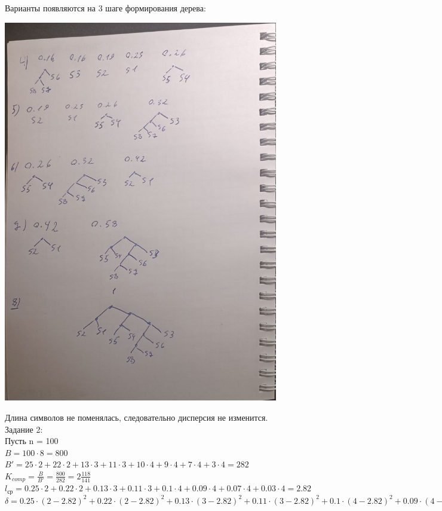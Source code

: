 \documentclass[a4paper,14pt]{extarticle}
\begin{document}
Варианты появляются на 3 шаге формирования дерева:
\begin{center}
    \includegraphics[width=120mm]{task1_var1.jpg}\\
\end{center}
Длина символов не поменялась, следовательно дисперсия не изменится.\\

Задание 2:\\
Пусть n = 100\\
$B = 100 \cdot 8 = 800$\\
$B' = 25 \cdot 2 + 22 \cdot 2 + 13 \cdot 3 + 11 \cdot 3 + 10 \cdot 4 + 9 \cdot 4 + 7 \cdot 4 + 3 \cdot 4 = 282$\\
$K_{comp} = \frac{B}{B'} = \frac{800}{282} = 2\frac{118}{141}$\\
$l_{ср} = 0.25 \cdot 2 + 0.22 \cdot 2 + 0.13 \cdot 3 + 0.11 \cdot 3 + 0.1 \cdot 4 + 0.09 \cdot 4 + 0.07 \cdot 4 + 0.03 \cdot 4 = 2.82$\\
$\delta = 0.25 \cdot (2 - 2.82)^2 + 0.22 \cdot (2 - 2.82)^2 + 0.13 \cdot (3 - 2.82)^2 + 0.11 \cdot (3 - 2.82)^2 + 0.1 \cdot (4 - 2.82)^2 + 0.09 \cdot (4 - 2.82)^2 + 0.07 \cdot (4 - 2.82)^2 + 0.03 \cdot (4 - 2.82)^2 = 0.7276$\\
\end{document}
